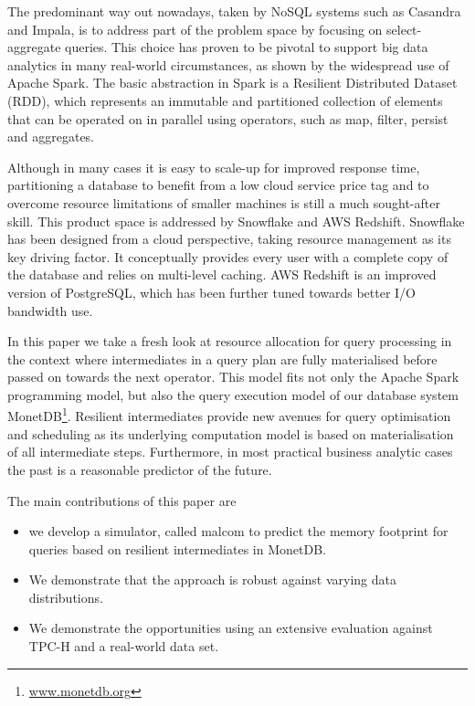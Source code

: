 \documentclass[conference]{IEEEtran}
\begin{document}
The predominant way out nowadays, taken by NoSQL systems such as Casandra and Impala, is to address part of the problem space by focusing on select-aggregate queries.
This choice has proven to be pivotal to support big data analytics in many real-world circumstances, as shown by the widespread use of Apache Spark.
The basic abstraction in Spark is a Resilient Distributed Dataset (RDD), which represents an immutable and partitioned collection of elements that can be operated on in parallel using operators, such as map, filter, persist and aggregates.

Although in many cases it is easy to scale-up for improved response time, partitioning a database to benefit from a low cloud service price tag and to overcome resource limitations of smaller machines is still a much sought-after skill.
This product space is addressed by Snowflake and AWS Redshift.
Snowflake has been designed from a cloud perspective, taking resource management as its key driving factor.
It conceptually provides every user with a complete copy of the database and relies on multi-level caching.
AWS Redshift is an improved version of PostgreSQL, which has been further tuned towards better I/O bandwidth use.

In this paper we take a fresh look at resource allocation for query processing in the context where intermediates in a query plan are fully materialised before passed on towards the next operator.
This model fits not only the Apache Spark programming model, but also the query execution model of our database system MonetDB\footnote{\url{www.monetdb.org}}.
Resilient intermediates provide new avenues for query optimisation and scheduling as its underlying computation model is based on materialisation of all intermediate steps.
Furthermore, in most practical business analytic cases the past is a reasonable predictor of the future.

The main contributions of this paper are
\begin{itemize}
	\item we develop a simulator, called {\sc malcom} to predict the memory footprint for queries based on resilient intermediates in MonetDB.
	\item We demonstrate that the approach is robust against varying data distributions.
	\item We demonstrate the opportunities using an extensive evaluation against TPC-H and a real-world data set.
\end{itemize}
\end{document}
